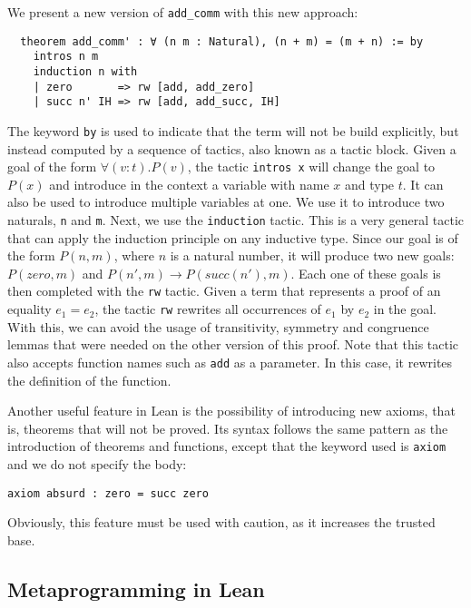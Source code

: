 We present a new version of \texttt{add\_comm} with this new approach:

\begin{verbatim}
  theorem add_comm' : ∀ (n m : Natural), (n + m) = (m + n) := by
    intros n m
    induction n with
    | zero       => rw [add, add_zero]
    | succ n' IH => rw [add, add_succ, IH]
\end{verbatim}

The keyword \texttt{by} is used to indicate that the term will not be build explicitly, but instead computed by a sequence of tactics, also known as a tactic block. Given a goal of the form $\forall (v : t) . P(v)$, the tactic \texttt{intros x} will change the goal to $P(x)$ and introduce in the context a variable with name $x$ and type $t$. It can also be used to introduce multiple variables at one. We use it to introduce two naturals, \texttt{n} and \texttt{m}. Next, we use the \texttt{induction} tactic. This is a very general tactic that can apply the induction principle on any inductive type. Since our goal is of the form $P(n, m)$, where $n$ is a natural number, it will produce two new goals: $P(zero, m)$ and $P(n', m) \rightarrow P(succ(n'), m)$. Each one of these goals is then completed with the \texttt{rw} tactic. Given a term that represents a proof of an equality $e_{1} = e_{2}$, the tactic \texttt{rw} rewrites all occurrences of $e_{1}$ by $e_{2}$ in the goal. With this, we can avoid the usage of transitivity, symmetry and congruence lemmas that were needed on the other version of this proof. Note that this tactic also accepts function names such as \texttt{add} as a parameter. In this case, it rewrites the definition of the function.

Another useful feature in Lean is the possibility of introducing new axioms, that is, theorems that will not be proved. Its syntax follows the same pattern as the introduction of theorems and functions, except that the keyword used is \texttt{axiom} and we do not specify the body:

\begin{verbatim}
axiom absurd : zero = succ zero
\end{verbatim}

Obviously, this feature must be used with caution, as it increases the trusted base.

\subsection{Metaprogramming in Lean}

